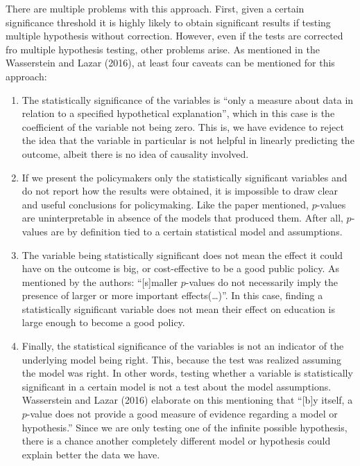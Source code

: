 \documentclass[11pt, english]{article}
\begin{document}
    There are multiple problems with this approach. First, given a certain
significance threshold it is highly likely to obtain significant results
if testing multiple hypothesis without correction. However, even if the
tests are corrected fro multiple hypothesis testing, other problems
arise. As mentioned in the Wasserstein and Lazar (2016), at least four
caveats can be mentioned for this approach:
\begin{enumerate}
\item The statistically significance of the variables is ``only a measure
about data in relation to a specified hypothetical explanation'', which
in this case is the coefficient of the variable not being zero. This is,
we have evidence to reject the idea that the variable in particular is
not helpful in linearly predicting the outcome, albeit there is no idea
of causality involved.

\item If we present the policymakers only the statistically significant
variables and do not report how the results were obtained, it is
impossible to draw clear and useful conclusions for policymaking. Like
the paper mentioned, \(p\)-values are uninterpretable in absence of the
models that produced them. After all, \(p\)-values are by definition
tied to a certain statistical model and assumptions.

\item The variable being statistically significant does not mean the effect it
could have on the outcome is big, or cost-effective to be a good public
policy. As mentioned by the authors: ``{[}s{]}maller \(p\)-values do not
necessarily imply the presence of larger or more important
effects(\ldots)''. In this case, finding a statistically significant
variable does not mean their effect on education is large enough to
become a good policy.

\item Finally, the statistical significance of the variables is not an
indicator of the underlying model being right. This, because the test
was realized assuming the model was right. In other words, testing
whether a variable is statistically significant in a certain model is
not a test about the model assumptions. Wasserstein and Lazar (2016)
elaborate on this mentioning that ``{[}b{]}y itself, a \(p\)-value does
not provide a good measure of evidence regarding a model or
hypothesis.'' Since we are only testing one of the infinite possible
hypothesis, there is a chance another completely different model or
hypothesis could explain better the data we have.
\end{enumerate}
\end{document}
